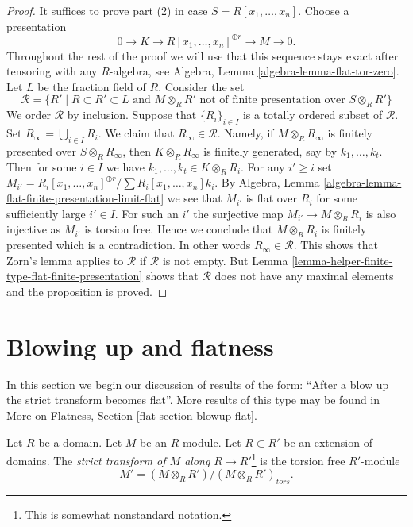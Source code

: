 \begin{proof}
It suffices to prove part (2) in case $S = R[x_1, \ldots, x_n]$.
Choose a presentation
$$
0 \to K \to R[x_1, \ldots, x_n]^{\oplus r} \to M \to 0.
$$
Throughout the rest of the proof we will use that this sequence stays exact
after tensoring with any $R$-algebra, see
Algebra, Lemma \ref{algebra-lemma-flat-tor-zero}.
Let $L$ be the fraction field of $R$.
Consider the set
$$
\mathcal{R} = \{R' \mid
R \subset R' \subset L
\text{ and }
M \otimes_R R'
\text{ not of finite presentation over }
S \otimes_R R'\}
$$
We order $\mathcal{R}$ by inclusion. Suppose that
$\{R_i\}_{i \in I}$ is a totally ordered subset of $\mathcal{R}$.
Set $R_{\infty} = \bigcup_{i \in I} R_i$.
We claim that $R_\infty \in \mathcal{R}$.
Namely, if $M \otimes_R R_{\infty}$ is finitely presented over
$S \otimes_R R_\infty$, then $K \otimes_R R_\infty$ is finitely
generated, say by $k_1, \ldots, k_t$. Then for some $i\in I$
we have $k_1, \ldots, k_t \in K \otimes_R R_i$. For any
$i' \geq i$ set
$M_{i'} = R_i[x_1, \ldots, x_n]^{\oplus r}/\sum R_i[x_1, \ldots, x_n]k_i$.
By
Algebra, Lemma \ref{algebra-lemma-flat-finite-presentation-limit-flat}
we see that $M_{i'}$ is flat over $R_i$ for some sufficiently large
$i' \in I$. For such an $i'$ the surjective map
$M_{i'} \to M \otimes_R R_i$ is also injective as
$M_{i'}$ is torsion free. Hence we conclude that
$M \otimes_R R_i$ is finitely presented which is a contradiction.
In other words $R_\infty \in \mathcal{R}$.
This shows that Zorn's lemma applies to $\mathcal{R}$ if $\mathcal{R}$
is not empty. But
Lemma \ref{lemma-helper-finite-type-flat-finite-presentation}
shows that $\mathcal{R}$ does not have any maximal elements and the
proposition is proved.
\end{proof}




\section{Blowing up and flatness}
\label{section-blowup-flat}

\noindent
In this section we begin our discussion of results of the form: ``After a
blow up the strict transform becomes flat''. More results of this type may
be found in More on Flatness, Section \ref{flat-section-blowup-flat}.

\begin{definition}
\label{definition-strict-transform}
Let $R$ be a domain. Let $M$ be an $R$-module. Let $R \subset R'$ be an
extension of domains. The {\it strict transform of $M$ along
$R \to R'$}\footnote{This is somewhat nonstandard notation.} is
the torsion free $R'$-module
$$
M' = (M \otimes_R R')/(M \otimes_R R')_{tors}.
$$
\end{definition}

